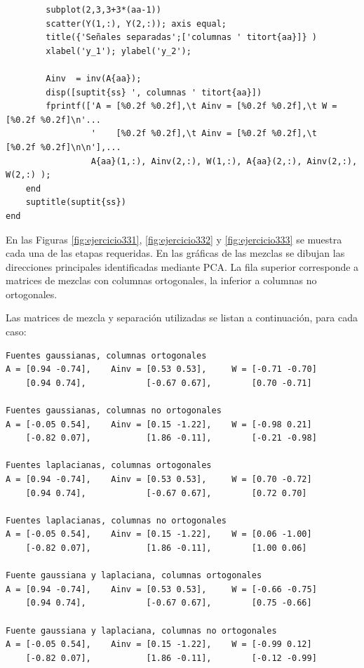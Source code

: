 \documentclass[11pt,a4paper,final]{article}
\begin{document}
\begin{verbatim}
        subplot(2,3,3+3*(aa-1))
        scatter(Y(1,:), Y(2,:)); axis equal;
        title({'Señales separadas';['columnas ' titort{aa}]} )
        xlabel('y_1'); ylabel('y_2');

        Ainv  = inv(A{aa});
        disp([suptit{ss} ', columnas ' titort{aa}])
        fprintf(['A = [%0.2f %0.2f],\t Ainv = [%0.2f %0.2f],\t W = [%0.2f %0.2f]\n'...
                 '    [%0.2f %0.2f],\t Ainv = [%0.2f %0.2f],\t     [%0.2f %0.2f]\n\n'],...
                 A{aa}(1,:), Ainv(2,:), W(1,:), A{aa}(2,:), Ainv(2,:), W(2,:) );
    end
    suptitle(suptit{ss})
end
\end{verbatim}


En las Figuras \ref{fig:ejercicio331}, \ref{fig:ejercicio332} y \ref{fig:ejercicio333} se muestra cada una de las etapas requeridas. En las gráficas de las mezclas se dibujan las direcciones principales identificadas mediante PCA. La fila superior corresponde a matrices de mezclas con columnas ortogonales, la inferior a columnas no ortogonales.

Las matrices de mezcla y separación utilizadas se listan a continuación, para cada caso:
\begin{verbatim}Fuentes gaussianas, columnas ortogonales
A = [0.94 -0.74],	 Ainv = [0.53 0.53],	 W = [-0.71 -0.70]
    [0.94 0.74],	        [-0.67 0.67],	     [0.70 -0.71]

Fuentes gaussianas, columnas no ortogonales
A = [-0.05 0.54],	 Ainv = [0.15 -1.22],	 W = [-0.98 0.21]
    [-0.82 0.07],	        [1.86 -0.11],	     [-0.21 -0.98]

Fuentes laplacianas, columnas ortogonales
A = [0.94 -0.74],	 Ainv = [0.53 0.53],	 W = [0.70 -0.72]
    [0.94 0.74],	        [-0.67 0.67],	     [0.72 0.70]

Fuentes laplacianas, columnas no ortogonales
A = [-0.05 0.54],	 Ainv = [0.15 -1.22],	 W = [0.06 -1.00]
    [-0.82 0.07],	        [1.86 -0.11],	     [1.00 0.06]

Fuente gaussiana y laplaciana, columnas ortogonales
A = [0.94 -0.74],	 Ainv = [0.53 0.53],	 W = [-0.66 -0.75]
    [0.94 0.74],	        [-0.67 0.67],	     [0.75 -0.66]

Fuente gaussiana y laplaciana, columnas no ortogonales
A = [-0.05 0.54],	 Ainv = [0.15 -1.22],	 W = [-0.99 0.12]
    [-0.82 0.07],	        [1.86 -0.11],	     [-0.12 -0.99]
\end{verbatim}
\end{document}
